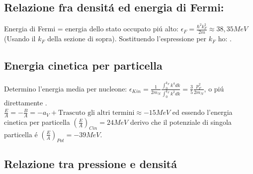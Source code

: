 \documentclass[main.tex]{subfiles}
\begin{document}
\subsection{Relazione fra densit\'a ed energia di Fermi:}
Energia di Fermi = energia dello stato occupato pi\'u alto: $\epsilon_F=\frac{\hbar^2k_F^2}{2m}\approx 38,35 MeV$ (Usando il $k_F$ della sezione di sopra).
Sostituendo l'espressione per $k_F$ ho: . 

\subsection{Energia cinetica per particella}
Determino l'energia media per nucleone:
$\epsilon_{Kin}=\frac{1}{2m_N}\frac{\int_0^{k_F}k^4dk}{\int_0^{k_F}k^2dk}=\frac{3}{5}\frac{p_F^2}{2m_N}$, o pi\'u direttamente .\\
$\frac{E}{A}=- \frac{B}{A}=-a_V+\text{Trascuto gli altri termini}\approx-15 MeV$ ed essendo l'energia cinetica per particella $(\frac{E}{A})_{Cin}=24 MeV$ derivo che il potenziale di singola particella \'e $(\frac{E}{A})_{Pot}=-39MeV$.

\subsection{Relazione tra pressione e densit\'a}

\end{document}

